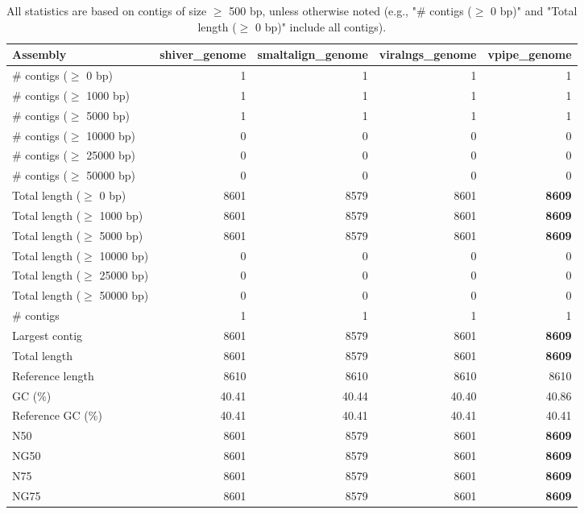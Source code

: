 \documentclass[12pt,a4paper]{article}
\begin{document}
\begin{table}[ht]
\begin{center}
\caption{All statistics are based on contigs of size $\geq$ 500 bp, unless otherwise noted (e.g., "\# contigs ($\geq$ 0 bp)" and "Total length ($\geq$ 0 bp)" include all contigs).}
\begin{tabular}{|l*{4}{|r}|}
\hline
Assembly & shiver\_genome & smaltalign\_genome & viralngs\_genome & vpipe\_genome \\ \hline
\# contigs ($\geq$ 0 bp) & 1 & 1 & 1 & 1 \\ \hline
\# contigs ($\geq$ 1000 bp) & 1 & 1 & 1 & 1 \\ \hline
\# contigs ($\geq$ 5000 bp) & 1 & 1 & 1 & 1 \\ \hline
\# contigs ($\geq$ 10000 bp) & 0 & 0 & 0 & 0 \\ \hline
\# contigs ($\geq$ 25000 bp) & 0 & 0 & 0 & 0 \\ \hline
\# contigs ($\geq$ 50000 bp) & 0 & 0 & 0 & 0 \\ \hline
Total length ($\geq$ 0 bp) & 8601 & 8579 & 8601 & {\bf 8609} \\ \hline
Total length ($\geq$ 1000 bp) & 8601 & 8579 & 8601 & {\bf 8609} \\ \hline
Total length ($\geq$ 5000 bp) & 8601 & 8579 & 8601 & {\bf 8609} \\ \hline
Total length ($\geq$ 10000 bp) & 0 & 0 & 0 & 0 \\ \hline
Total length ($\geq$ 25000 bp) & 0 & 0 & 0 & 0 \\ \hline
Total length ($\geq$ 50000 bp) & 0 & 0 & 0 & 0 \\ \hline
\# contigs & 1 & 1 & 1 & 1 \\ \hline
Largest contig & 8601 & 8579 & 8601 & {\bf 8609} \\ \hline
Total length & 8601 & 8579 & 8601 & {\bf 8609} \\ \hline
Reference length & 8610 & 8610 & 8610 & 8610 \\ \hline
GC (\%) & 40.41 & 40.44 & 40.40 & 40.86 \\ \hline
Reference GC (\%) & 40.41 & 40.41 & 40.41 & 40.41 \\ \hline
N50 & 8601 & 8579 & 8601 & {\bf 8609} \\ \hline
NG50 & 8601 & 8579 & 8601 & {\bf 8609} \\ \hline
N75 & 8601 & 8579 & 8601 & {\bf 8609} \\ \hline
NG75 & 8601 & 8579 & 8601 & {\bf 8609} \\ \hline

\end{tabular}
\end{center}
\end{table}
\end{document}

